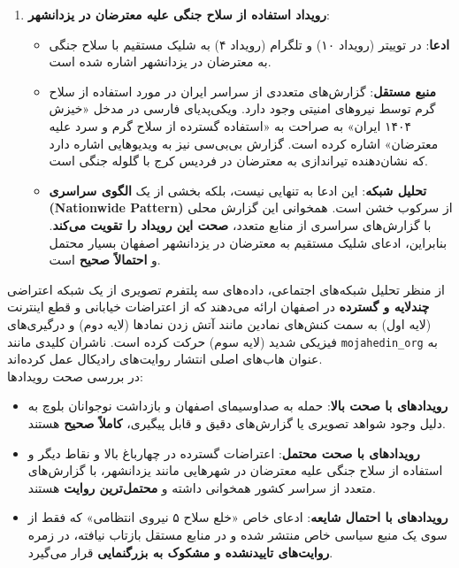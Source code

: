\documentclass{article}
\begin{document}
\begin{enumerate}
		\item \textbf{رویداد استفاده از سلاح جنگی علیه معترضان در یزدانشهر}:
		\begin{itemize}
			\item \textbf{ادعا}: در توییتر (رویداد ۱۰) و تلگرام (رویداد ۴) به شلیک مستقیم با سلاح جنگی به معترضان در یزدانشهر اشاره شده است.
			\item \textbf{منبع مستقل}: گزارش‌های متعددی از سراسر ایران در مورد استفاده از سلاح گرم توسط نیروهای امنیتی وجود دارد. ویکی‌پدیای فارسی در مدخل «خیزش ۱۴۰۴ ایران»  به صراحت به «استفاده گسترده از سلاح گرم و سرد علیه معترضان» اشاره کرده است. گزارش بی‌بی‌سی  نیز به ویدیوهایی اشاره دارد که نشان‌دهنده تیراندازی به معترضان در فردیس کرج با گلوله جنگی است.
			\item \textbf{تحلیل شبکه}: این ادعا به تنهایی نیست، بلکه بخشی از یک \textbf{الگوی سراسری (Nationwide Pattern)} از سرکوب خشن است. همخوانی این گزارش محلی با گزارش‌های سراسری از منابع متعدد، \textbf{صحت این رویداد را تقویت می‌کند}. بنابراین، ادعای شلیک مستقیم به معترضان در یزدانشهر اصفهان بسیار محتمل و \textbf{احتمالاً صحیح} است.
		\end{itemize}
	\end{enumerate}
از منظر تحلیل شبکه‌های اجتماعی، داده‌های سه پلتفرم تصویری از یک شبکه اعتراضی \textbf{چندلایه و گسترده} در اصفهان ارائه می‌دهند که از اعتراضات خیابانی و قطع اینترنت (لایه اول) به سمت کنش‌های نمادین مانند آتش زدن نمادها (لایه دوم) و درگیری‌های فیزیکی شدید (لایه سوم) حرکت کرده است. ناشران کلیدی مانند \texttt{mojahedin\_org} به عنوان هاب‌های اصلی انتشار روایت‌های رادیکال عمل کرده‌اند.
\\
در بررسی صحت رویدادها:
\begin{itemize}
\item \textbf{رویدادهای با صحت بالا}: حمله به صداوسیمای اصفهان \cite{bbc_isfahan_attack} و بازداشت نوجوانان بلوچ \cite{rasanknews_baluch} به دلیل وجود شواهد تصویری یا گزارش‌های دقیق و قابل پیگیری، \textbf{کاملاً صحیح} هستند.
\item \textbf{رویدادهای با صحت محتمل}: اعتراضات گسترده در چهارباغ بالا و نقاط دیگر و استفاده از سلاح جنگی علیه معترضان در شهرهایی مانند یزدانشهر، با گزارش‌های متعدد از سراسر کشور همخوانی داشته و \textbf{محتمل‌ترین روایت} هستند.
\item \textbf{رویدادهای با احتمال شایعه}: ادعای خاص «خلع سلاح ۵ نیروی انتظامی» که فقط از سوی یک منبع سیاسی خاص منتشر شده و در منابع مستقل بازتاب نیافته، در زمره \textbf{روایت‌های تاییدنشده و مشکوک به بزرگنمایی} قرار می‌گیرد.
\end{itemize}
	
\end{document}
